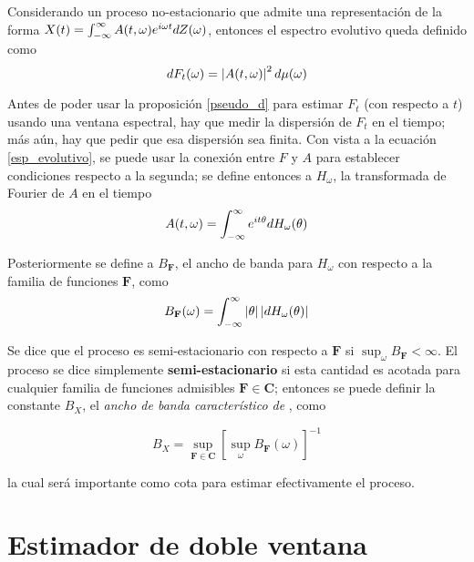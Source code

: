 Considerando un proceso no-estacionario \xt que admite una representación de la forma 
$X(t) = \int_{-\infty}^{\infty} A(t,\omega) e^{i \omega t} dZ(\omega)$, entonces el espectro evolutivo queda definido 
como
\begin{equation}
dF_t(\omega) = \left| A(t,\omega) \right|^{2} d\mu(\omega)
\label{esp_evolutivo}
\end{equation}

Antes de poder usar la proposición \ref{pseudo_d} para estimar $F_t$ (con respecto a $t$) usando 
una ventana espectral, hay que medir la dispersión de $F_t$ en el tiempo; más aún, hay que pedir 
que esa dispersión sea finita.
Con vista a la ecuación \ref{esp_evolutivo}, se puede usar la conexión entre $F$ y $A$ para 
establecer condiciones respecto a la segunda; se define entonces a $H_\omega$, la transformada de
Fourier de $A$ en el tiempo
\begin{equation}
A(t,\omega) = \int_{-\infty}^{\infty} e^{i t \theta} dH_\omega(\theta)
\end{equation}

Posteriormente se define a $B_{\mathbf{F}}$, el ancho de banda para $H_\omega$ con respecto a la 
familia de funciones $\mathbf{F}$, como
%
\begin{equation}
B_{\mathbf{F}}(\omega) = \int_{-\infty}^{\infty} \left| \theta \right| \left| dH_\omega(\theta) \right|
\end{equation}

Se dice que el proceso es semi-estacionario con respecto a $\mathbf{F}$ si 
$\sup_\omega B_{\mathbf{F}} < \infty$. El proceso se dice simplemente \textbf{semi-estacionario} 
si esta cantidad es acotada para cualquier familia de funciones admisibles 
$\mathbf{F} \in \mathbf{C}$; entonces se puede definir la constante $B_X$, el \textit{ancho de 
banda característico de} \xt, como

\begin{equation}
B_X = \sup_{\mathbf{F}\in \mathbf{C}} \left[ \sup_\omega B_{\mathbf{F}}(\omega) \right]^{-1}
\end{equation}

la cual será importante como cota para estimar efectivamente el proceso.


\section{Estimador de doble ventana}

